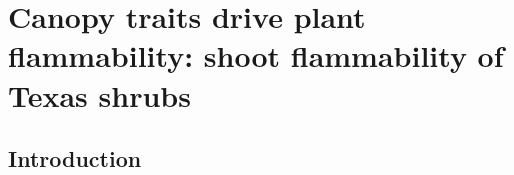 \documentclass{ttuthes2007}
\begin{document}
\listoftables
\listoffigures

\mainmatter


\linenumbers
\renewcommand{\linenumberfont}{\normalfont\bfseries\large\color{black}}

\chapter{Canopy traits drive plant flammability: shoot flammability of Texas shrubs}

\section{Introduction}
\end{document}
